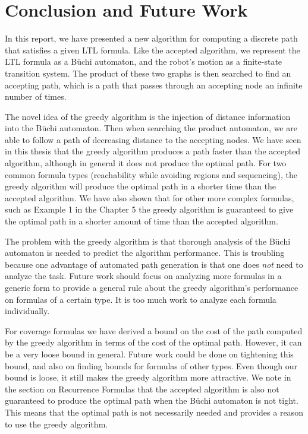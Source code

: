 \chapter{Conclusion and Future Work}
In this report, we have presented a new algorithm for computing a discrete path that satisfies a given LTL formula. Like the accepted algorithm, we represent the LTL formula as a B\"uchi automaton, and the robot's motion as a finite-state transition system. The product of these two graphs is then searched to find an accepting path, which is a path that passes through an accepting node an infinite number of times. 

The novel idea of the greedy algorithm is the injection of distance information into the B\"uchi automaton. Then when searching the product automaton, we are able to follow a path of decreasing distance to the accepting nodes. We have seen in this thesis that the greedy algorithm produces a path faster than the accepted algorithm, although in general it does not produce the optimal path. For two common formula types (reachability while avoiding regions and sequencing), the greedy algorithm will produce the optimal path in a shorter time than the accepted algorithm. We have also shown that for other more complex formulas, such as Example 1 in the Chapter 5 the greedy algorithm is guaranteed to give the optimal path in a shorter amount of time than the accepted algorithm. 

The problem with the greedy algorithm is that thorough analysis of the B\"uchi automaton is needed to predict the algorithm performance. This is troubling because one advantage of automated path generation is that one does \textit{not} need to analyze the task. Future work should focus on analyzing more formulas in a generic form to provide a general rule about the greedy algorithm's performance on formulas of a certain type. It is too much work to analyze each formula individually.    

For coverage formulas we have derived a bound on the cost of the path computed by the greedy algorithm in terms of the cost of the optimal path. However, it can be a very loose bound in general. Future work could be done on tightening this bound, and also on finding bounds for formulas of other types. Even though our bound is loose, it still makes the greedy algorithm more attractive. We note in the section on Recurrence Formulas that the accepted algorithm is also not guaranteed to produce the optimal path when the B\"uchi automaton is not tight. This means that the optimal path is not necessarily needed and provides a reason to use the greedy algorithm.


